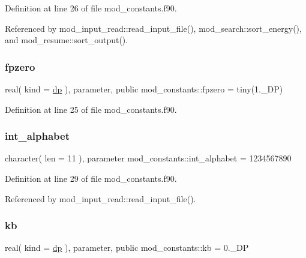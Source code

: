 Definition at line 26 of file mod\+\_\+constants.\+f90.



Referenced by mod\+\_\+input\+\_\+read\+::read\+\_\+input\+\_\+file(), mod\+\_\+search\+::sort\+\_\+energy(), and mod\+\_\+resume\+::sort\+\_\+output().

\mbox{\label{namespacemod__constants_a1f06c759fc8a61d66f343865300c37d1}} 
\subsubsection{\texorpdfstring{fpzero}{fpzero}}
{\footnotesize\ttfamily real( kind = \hyperlink{namespacemod__constants_ac7aeda7f1802c4ef2a4780773c028214}{dp} ), parameter, public mod\+\_\+constants\+::fpzero = tiny(1.\+\_\+\+D\+P)}



Definition at line 25 of file mod\+\_\+constants.\+f90.

\mbox{\label{namespacemod__constants_a41cb897f7d31e58ab3c2b2f7ecf86983}} 
\subsubsection{\texorpdfstring{int\+\_\+alphabet}{int\_alphabet}}
{\footnotesize\ttfamily character( len = 11 ), parameter mod\+\_\+constants\+::int\+\_\+alphabet = \textquotesingle{}1234567890\textquotesingle{}}



Definition at line 29 of file mod\+\_\+constants.\+f90.



Referenced by mod\+\_\+input\+\_\+read\+::read\+\_\+input\+\_\+file().

\mbox{\label{namespacemod__constants_af84a9ff68ff16d57560ea196b8e560d4}} 
\subsubsection{\texorpdfstring{kb}{kb}}
{\footnotesize\ttfamily real( kind = \hyperlink{namespacemod__constants_ac7aeda7f1802c4ef2a4780773c028214}{dp} ), parameter, public mod\+\_\+constants\+::kb = 0.\+\_\+\+DP}



